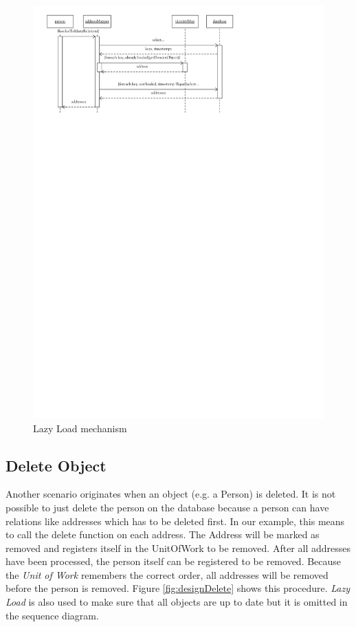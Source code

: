 			\begin{figure}
				\begin{center}
					\includegraphics{./files/inc/figures/DesignLazyLoad}
					\caption{\label{fig:designLazyLoad} Lazy Load mechanism}
				\end{center}
			\end{figure}
			
		\subsection{Delete Object}
			Another scenario originates when an object (e.g. a Person) is deleted. It is not
			possible to just delete the person on the database because a person can have
			relations like addresses which has to be deleted first.
			In our example, this means to call the delete function on each address. The Address 
			will be marked as removed and registers itself in the UnitOfWork to be removed.
			After all addresses have been processed, the person
			itself can be registered to be removed. Because the \textit{Unit of Work} remembers
			the correct order, all addresses will be removed before the person is removed.
			Figure \ref{fig:designDelete} shows this procedure. \textit{Lazy Load}
			is also used to make sure that all objects are up to date but it is omitted in the
			sequence diagram.
						
